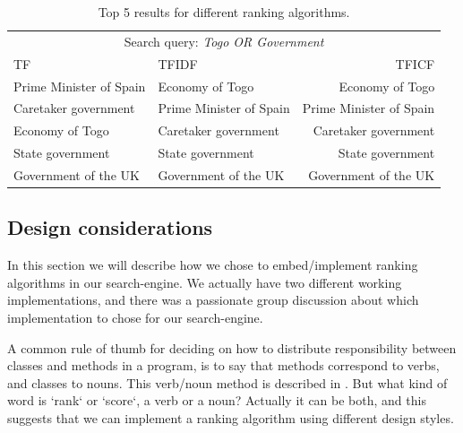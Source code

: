 \begin{table}
	\centering
\begin{tabular}{@{}llr@{}} \toprule
	\multicolumn{3}{c}{Search query: \textit{Togo OR Government}} \\ \cmidrule(r){1-3}
	TF 									& TFIDF 							& TFICF \\ \midrule
	Prime Minister of Spain 			& Economy of Togo 					& Economy of Togo \\
	Caretaker government 				& Prime Minister of Spain 			& Prime Minister of Spain \\
	Economy of Togo		    			& Caretaker government 				& Caretaker government \\
	State government 					& State government					& State government \\
	Government of the UK 	& Government of the UK 	& Government of the UK \\ \bottomrule
\end{tabular}
\caption{Top 5 results for different ranking algorithms.}	
\label{tab:comparisonRankingAlgorithms}
\end{table}


\subsection{Design considerations}
In this section we will describe how we chose to embed/implement ranking algorithms in our search-engine. We actually have two different working implementations, and there was a passionate group discussion about which implementation to chose for our search-engine.  

A common rule of thumb for deciding on how to distribute responsibility between classes and methods in a program, is to say that methods correspond to verbs, and classes to nouns. This verb/noun method is described in \cite[p.530]{BK}.
But what kind of word is `rank` or `score`, a verb or a noun? Actually it can be both, and this suggests that we can implement a ranking algorithm using different design styles.

